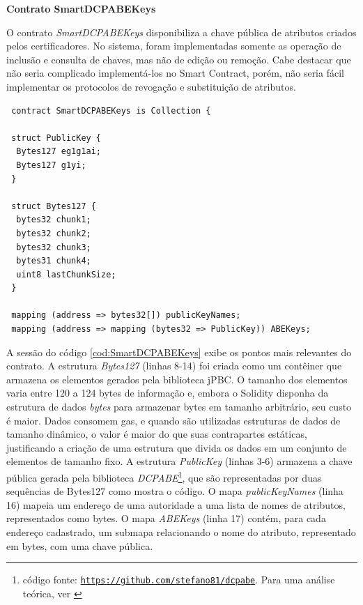 \documentclass[a4paper,11pt]{article}
\begin{document}
\textbf{Contrato SmartDCPABEKeys}



O contrato \emph{SmartDCPABEKeys} disponibiliza a chave pública de atributos criados pelos certificadores.
No sistema, foram implementadas somente as operação de inclusão e consulta de chaves, mas não de edição ou remoção.
Cabe destacar que não seria complicado implementá-los no Smart Contract, porém, não seria fácil implementar os protocolos de revogação e substituição de atributos.%


\begin{lstlisting}
 contract SmartDCPABEKeys is Collection {

 struct PublicKey {
  Bytes127 eg1g1ai;
  Bytes127 g1yi;
 }

 struct Bytes127 {
  bytes32 chunk1;
  bytes32 chunk2;
  bytes32 chunk3;
  bytes31 chunk4;
  uint8 lastChunkSize;
 }

 mapping (address => bytes32[]) publicKeyNames;
 mapping (address => mapping (bytes32 => PublicKey)) ABEKeys;
\end{lstlisting}


A sessão do código \ref{cod:SmartDCPABEKeys} exibe os pontos mais relevantes do contrato.
A estrutura \emph{Bytes127} (linhas 8-14) foi criada como um contêiner que armazena os elementos gerados pela biblioteca jPBC.
O tamanho dos elementos varia entre 120 a 124 bytes de informação e, embora o Solidity disponha da estrutura de dados \emph{bytes} para armazenar bytes em tamanho arbitrário, seu custo é maior.
Dados consomem gas, e quando são utilizadas estruturas de dados de tamanho dinâmico, o valor é maior do que suas contrapartes estáticas, justificando a criação de uma estrutura que divida os dados em um conjunto de elementos de tamanho fixo.
A estrutura \emph{PublicKey} (linhas 3-6) armazena a chave pública gerada pela biblioteca \emph{DCPABE}\footnote{código fonte: \href{https://github.com/stefano81/dcpabe}{\texttt{https://github.com/stefano81/dcpabe}}. Para uma análise teórica, ver \cite{Lewko2011}}, que são representadas por duas sequências de Bytes127 como mostra o código.
O mapa \emph{publicKeyNames} (linha 16) mapeia um endereço de uma autoridade a uma lista de nomes de atributos, representados como bytes.
O mapa \emph{ABEKeys} (linha 17) contém, para cada endereço cadastrado, um submapa relacionando o nome do atributo, representado em bytes, com uma chave pública.
\end{document}
